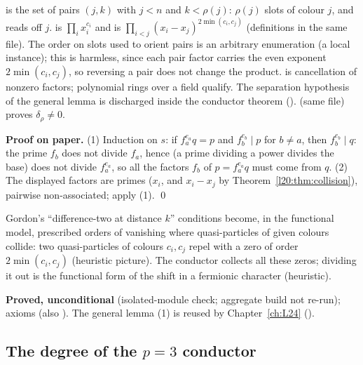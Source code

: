 \begin{dictionary}
 is the set of pairs $(j,k)$ with $j<n$ and $k<\rho(j)$: $\rho(j)$ slots of colour $j$, and
 reads off $j$.  is $\prod_ix_i^{c_i}$ and  is
$\prod_{i<j}(x_i-x_j)^{2\min(c_i,c_j)}$ (definitions in the same file). The order on slots used to orient pairs is an arbitrary enumeration (a local instance); this is
harmless, since each pair factor carries the even exponent $2\min(c_i,c_j)$, so reversing a pair does not change the product.
 is cancellation of nonzero factors; polynomial rings over a field qualify. The separation hypothesis of
the general lemma is discharged inside the conductor theorem (). 
(same file) proves $\delta_\rho\ne0$.
\end{dictionary}

\textbf{Proof on paper.} (1) Induction on $s$: if $f_a^{e_a}q=p$ and $f_b^{e_b}\mid p$ for $b\ne a$, then $f_b^{e_b}\mid q$: the prime $f_b$ does not divide
$f_a$, hence (a prime dividing a power divides the base) does not divide $f_a^{e_a}$, so all the factors $f_b$ of $p = f_a^{e_a}q$ must
come from $q$. (2) The displayed factors are primes ($x_i$, and $x_i-x_j$ by Theorem~\ref{l20:thm:collision}), pairwise
non-associated; apply (1). \qed

\begin{physics}
Gordon's ``difference-two at distance $k$'' conditions become, in the functional model, prescribed orders of vanishing where quasi-particles
of given colours collide: two quasi-particles of colours $c_i,c_j$ repel with a zero of order $2\min(c_i,c_j)$ (heuristic picture). The conductor collects all
these zeros; dividing it out is the functional form of the shift in a fermionic character (heuristic).
\end{physics}

\begin{status}
\textbf{Proved, unconditional} (isolated-module check; aggregate build not re-run); axioms  (also ). The general
lemma (1) is reused by Chapter~\ref{ch:L24} ().
\end{status}

\subsection{The degree of the \texorpdfstring{$p=3$}{p=3} conductor}

